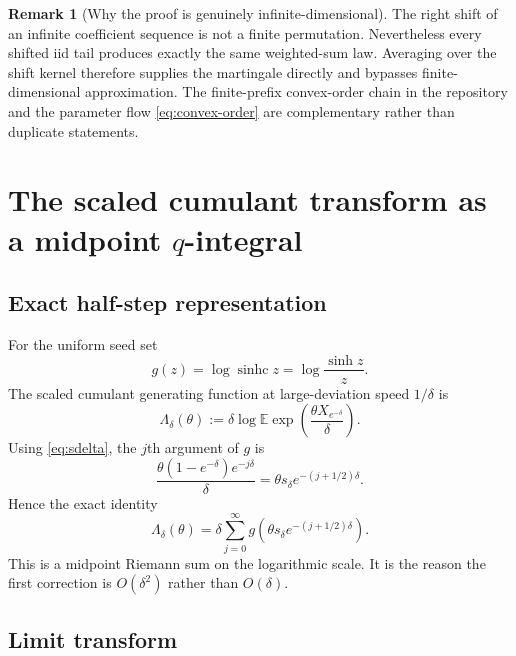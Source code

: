 \documentclass[11pt,a4paper]{article}
\theoremstyle{definition}
\newtheorem{remark}[theorem]{Remark}
\newcommand{\E}{\mathbb{E}}
\newcommand{\sinhc}{\operatorname{sinhc}}
\newcommand{\1}{\mathbf{1}}
\begin{document}
\begin{remark}[Why the proof is genuinely infinite-dimensional]
The right shift of an infinite coefficient sequence is not a finite
permutation.  Nevertheless every shifted iid tail produces exactly the same
weighted-sum law.  Averaging over the shift kernel therefore supplies the
martingale directly and bypasses finite-dimensional approximation.  The
finite-prefix convex-order chain in the repository and the parameter flow
\eqref{eq:convex-order} are complementary rather than duplicate statements.
\end{remark}

\section{The scaled cumulant transform as a midpoint \texorpdfstring{$q$}{q}-integral}
\label{sec:midpoint}

\subsection{Exact half-step representation}

For the uniform seed set
\begin{equation}
 g(z)=\log\sinhc z=\log\frac{\sinh z}{z}.
 \label{eq:gdef}
\end{equation}
The scaled cumulant generating function at large-deviation speed
$1/\delta$ is
\begin{equation}
 \Lambda_\delta(\theta)
 :=\delta\log\E\exp\!\left(\frac{\theta X_{e^{-\delta}}}{\delta}\right).
 \label{eq:scaled-cgf}
\end{equation}
Using \eqref{eq:sdelta}, the $j$th argument of $g$ is
\[
 \frac{\theta(1-e^{-\delta})e^{-j\delta}}{\delta}
 =\theta s_\delta e^{-(j+1/2)\delta}.
\]
Hence the exact identity
\begin{equation}
 \boxed{\quad
 \Lambda_\delta(\theta)
 =\delta\sum_{j=0}^{\infty}
 g\!\left(\theta s_\delta e^{-(j+1/2)\delta}\right).
 \quad}
 \label{eq:midpoint-sum}
\end{equation}
This is a midpoint Riemann sum on the logarithmic scale.  It is the reason the
first correction is $O(\delta^2)$ rather than $O(\delta)$.

\subsection{Limit transform}
\end{document}
